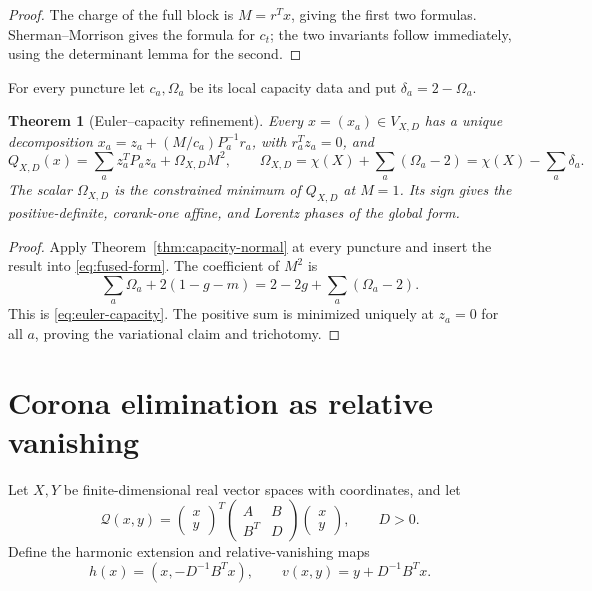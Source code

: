 \documentclass[11pt,a4paper]{amsart}
\theoremstyle{plain}
\newtheorem{theorem}{Theorem}[section]
\theoremstyle{definition}
\begin{document}
\begin{proof}
The charge of the full block is $M=r^Tx$, giving the first two formulas.  Sherman--Morrison gives
the formula for $c_t$; the two invariants follow immediately, using the determinant lemma for the
second.
\end{proof}

For every puncture let $c_a,\Omega_a$ be its local capacity data and put
$\delta_a=2-\Omega_a$.

\begin{theorem}[Euler--capacity refinement]\label{thm:euler-capacity}
Every $x=(x_a)\in V_{X,D}$ has a unique decomposition
$x_a=z_a+(M/c_a)P_a^{-1}r_a$, with $r_a^Tz_a=0$, and
\begin{equation}\label{eq:euler-capacity}
 \boxed{
 Q_{X,D}(x)=\sum_a z_a^TP_az_a+\Omega_{X,D}M^2,
 \qquad
 \Omega_{X,D}=\chi(X)+\sum_a(\Omega_a-2)
              =\chi(X)-\sum_a\delta_a.}                    \tag{EC}
\end{equation}
The scalar $\Omega_{X,D}$ is the constrained minimum of $Q_{X,D}$ at $M=1$.  Its sign gives the
positive-definite, corank-one affine, and Lorentz phases of the global form.
\end{theorem}

\begin{proof}
Apply Theorem~\ref{thm:capacity-normal} at every puncture and insert the result into
\eqref{eq:fused-form}.  The coefficient of $M^2$ is
\[
 \sum_a\Omega_a+2(1-g-m)=2-2g+\sum_a(\Omega_a-2).
\]
This is \eqref{eq:euler-capacity}.  The positive sum is minimized uniquely at $z_a=0$ for all
$a$, proving the variational claim and trichotomy.
\end{proof}

\section{Corona elimination as relative vanishing}\label{sec:corona}

Let $X,Y$ be finite-dimensional real vector spaces with coordinates, and let
\[
             \mathcal Q(x,y)=
             \begin{pmatrix}x\\y\end{pmatrix}^{T}
             \begin{pmatrix}A&B\\B^T&D\end{pmatrix}
             \begin{pmatrix}x\\y\end{pmatrix},
             \qquad D>0.
\]
Define the harmonic extension and relative-vanishing maps
\begin{equation}\label{eq:corona-maps}
 h(x)=(x,-D^{-1}B^Tx),\qquad
 v(x,y)=y+D^{-1}B^Tx.
\end{equation}
\end{document}
